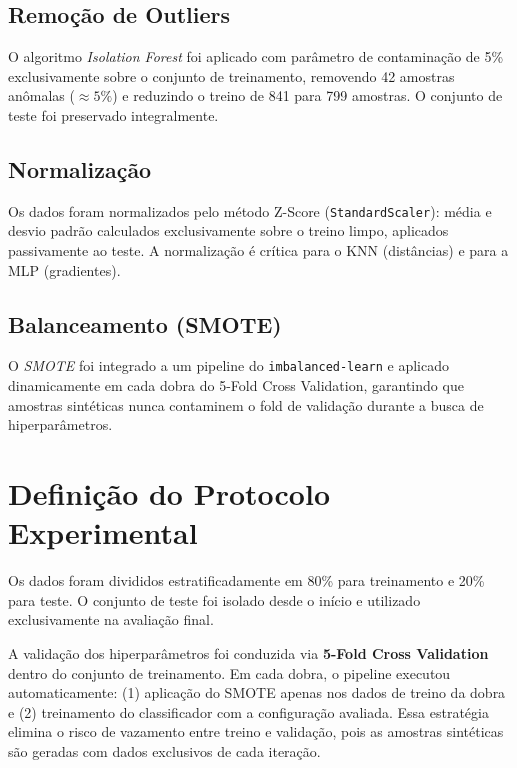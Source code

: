 \documentclass[12pt, a4paper]{article}
\begin{document}
\subsection{Remoção de Outliers}

O algoritmo \textit{Isolation Forest} foi aplicado com parâmetro de contaminação
de 5\% exclusivamente sobre o conjunto de treinamento, removendo 42 amostras
anômalas ($\approx 5\%$) e reduzindo o treino de 841 para 799 amostras. O
conjunto de teste foi preservado integralmente.

\subsection{Normalização}

Os dados foram normalizados pelo método Z-Score (\texttt{StandardScaler}):
média e desvio padrão calculados exclusivamente sobre o treino limpo, aplicados
passivamente ao teste. A normalização é crítica para o KNN (distâncias) e para
a MLP (gradientes).

\subsection{Balanceamento (SMOTE)}

O \textit{SMOTE} foi integrado a um pipeline do \texttt{imbalanced-learn} e
aplicado dinamicamente em cada dobra do 5-Fold Cross Validation, garantindo que
amostras sintéticas nunca contaminem o fold de validação durante a busca de
hiperparâmetros.

\section{Definição do Protocolo Experimental}

Os dados foram divididos estratificadamente em 80\% para treinamento e 20\% para
teste. O conjunto de teste foi isolado desde o início e utilizado exclusivamente
na avaliação final.

A validação dos hiperparâmetros foi conduzida via \textbf{5-Fold Cross
Validation} dentro do conjunto de treinamento. Em cada dobra, o pipeline
executou automaticamente: (1) aplicação do SMOTE apenas nos dados de treino da
dobra e (2) treinamento do classificador com a configuração avaliada. Essa
estratégia elimina o risco de vazamento entre treino e validação, pois as
amostras sintéticas são geradas com dados exclusivos de cada iteração.
\end{document}
